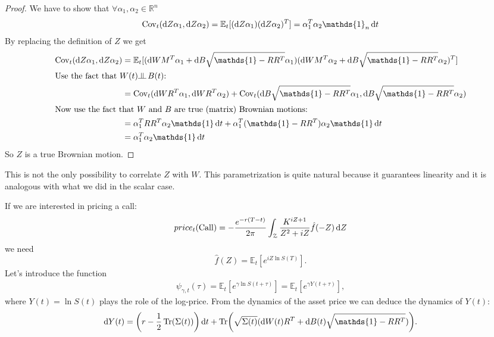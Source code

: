 \begin{proof}
    We have to show that $\forall \alpha_1,\alpha_2\in\mathbb{R}^n$
    \begin{align*}
        \Cov_t(\dd Z\alpha_1, \dd Z\alpha_2) = \mathbb{E}_t[(\dd Z\alpha_1)(\dd Z\alpha_2)^T] = \alpha_1^T\alpha_2\mathds{1}_n\,\dd t
    \end{align*}
    By replacing the definition of $Z$ we get
    \begin{align*}
        \Cov_t(\dd Z\alpha_1, \dd Z\alpha_2) &= \mathbb{E}_t[(\dd WM^T\alpha_1 + \dd B\sqrt{\mathds{1}-RR^T}\alpha_1)(\dd WM^T\alpha_2 + \dd B\sqrt{\mathds{1}-RR^T}\alpha_2)^T] \\
        \intertext{Use the fact that $W(t)\indep\, B(t)$:}
        &=
        \Cov_t(\dd WR^T\alpha_1, \dd WR^T\alpha_2) + \Cov_t(\dd B\sqrt{\mathds{1}-RR^T}\alpha_1, \dd B\sqrt{\mathds{1}-RR^T}\alpha_2) \\
        \intertext{Now use the fact that $W$ and $B$ are true (matrix) Brownian motions:}
        &=
        \alpha_1^T RR^T \alpha_2\mathds{1}\,\dd t + \alpha_1^T(\mathds{1}-RR^T)\alpha_2\mathds{1}\,\dd t \\
        &=
        \alpha_1^T\alpha_2\mathds{1}\,\dd t
    \end{align*}
    So $Z$ is a true Brownian motion.
\end{proof}
\begin{remark}
    This is not the only possibility to correlate $Z$ with $W$. This parametrization is quite natural because it guarantees linearity and it is analogous with what we did in the scalar case.
\end{remark}
If we are interested in pricing a call:
\begin{align*}
    price_t(\operatorname{Call}) = -\frac{e^{-r(T-t)}}{2\pi}\int_{\mathcal{Z}}\frac{K^{iZ+1}}{Z^2+iZ}\hat{f}(-Z)\,\dd Z
\end{align*}
we need
\begin{equation*}
    \hat{f}(Z) = \mathbb{E}_t[e^{iZ\ln S(T)}].
\end{equation*}
Let's introduce the function
\begin{align}
    \psi_{\gamma, t}(\tau) = \mathbb{E}_t\left[e^{\gamma\ln S(t+\tau)}\right] = \mathbb{E}_t\left[e^{\gamma Y(t+\tau)}\right],
\end{align}
where $Y(t) = \ln S(t)$ plays the role of the log-price. From the dynamics of the asset price we can deduce the dynamics of $Y(t)$:
\begin{equation*}
    \dd Y(t) = \left(r-\frac{1}{2}\Tr(\Sigma(t))\right)\dd t + \Tr(\sqrt{\Sigma(t)}(\dd W(t)R^T+\dd B(t)\sqrt{\mathds{1}-RR^T})).
\end{equation*}
